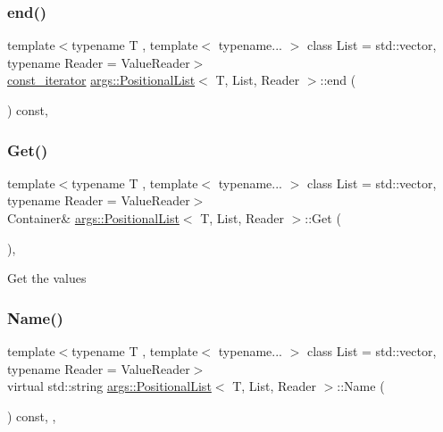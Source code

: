\subsubsection{\texorpdfstring{end()}{end()}\hspace{0.1cm}{\footnotesize\ttfamily [2/2]}}
{\footnotesize\ttfamily template$<$typename T , template$<$ typename... $>$ class List = std\+::vector, typename Reader  = Value\+Reader$>$ \\
\hyperlink{classargs_1_1_positional_list_a5675a3e27a2a7fc6a7fbd933bd13f3cf}{const\+\_\+iterator} \hyperlink{classargs_1_1_positional_list}{args\+::\+Positional\+List}$<$ T, List, Reader $>$\+::end (\begin{DoxyParamCaption}{ }\end{DoxyParamCaption}) const\hspace{0.3cm}{\ttfamily [inline]}, {\ttfamily [noexcept]}}

\mbox{\label{classargs_1_1_positional_list_a9f3c9a6e82c270342bbaedda83b7e9bb}} 
\subsubsection{\texorpdfstring{Get()}{Get()}}
{\footnotesize\ttfamily template$<$typename T , template$<$ typename... $>$ class List = std\+::vector, typename Reader  = Value\+Reader$>$ \\
Container\& \hyperlink{classargs_1_1_positional_list}{args\+::\+Positional\+List}$<$ T, List, Reader $>$\+::Get (\begin{DoxyParamCaption}{ }\end{DoxyParamCaption})\hspace{0.3cm}{\ttfamily [inline]}, {\ttfamily [noexcept]}}

Get the values \mbox{\label{classargs_1_1_positional_list_a5109dbd118c40b6cde570fa37acac950}} 
\subsubsection{\texorpdfstring{Name()}{Name()}}
{\footnotesize\ttfamily template$<$typename T , template$<$ typename... $>$ class List = std\+::vector, typename Reader  = Value\+Reader$>$ \\
virtual std\+::string \hyperlink{classargs_1_1_positional_list}{args\+::\+Positional\+List}$<$ T, List, Reader $>$\+::Name (\begin{DoxyParamCaption}{ }\end{DoxyParamCaption}) const\hspace{0.3cm}{\ttfamily [inline]}, {\ttfamily [override]}, {\ttfamily [virtual]}}



